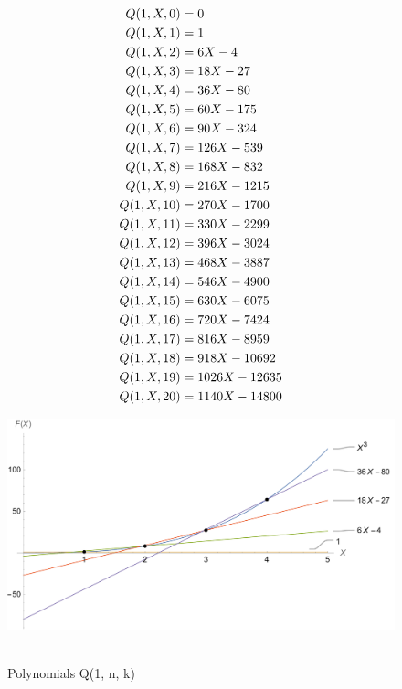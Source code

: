 ﻿\begin{align*}
    {Q}(1,X,0) &= 0 \\
    {Q}(1,X,1) &= 1 \\
    {Q}(1,X,2) &= 6X - 4 \\
    {Q}(1,X,3) &= 18X - 27 \\
    {Q}(1,X,4) &= 36X - 80 \\
    {Q}(1,X,5) &= 60X - 175 \\
    {Q}(1,X,6) &= 90X - 324 \\
    {Q}(1,X,7) &= 126X - 539 \\
    {Q}(1,X,8) &= 168X - 832 \\
    {Q}(1,X,9) &= 216X - 1215 \\
    {Q}(1,X,10) &= 270X - 1700 \\
    {Q}(1,X,11) &= 330X - 2299 \\
    {Q}(1,X,12) &= 396X - 3024 \\
    {Q}(1,X,13) &= 468X - 3887 \\
    {Q}(1,X,14) &= 546X - 4900 \\
    {Q}(1,X,15) &= 630X - 6075 \\
    {Q}(1,X,16) &= 720X - 7424 \\
    {Q}(1,X,17) &= 816X - 8959 \\
    {Q}(1,X,18) &= 918X - 10692 \\
    {Q}(1,X,19) &= 1026X - 12635 \\
    {Q}(1,X,20) &= 1140X - 14800
\end{align*}
\begin{figure}[H]
    \centering
    \includegraphics[width=1\textwidth]{sections/images/02_plots_cubes_with_q1}
    ~\caption{Polynomials Q(1, n, k)}\label{fig:figure2}
\end{figure}

